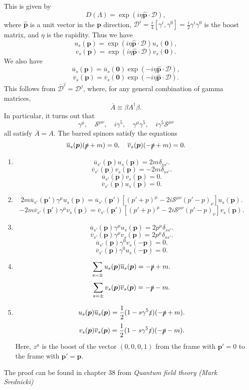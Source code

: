 This is given by
\[D(\Lambda) = \exp(i\eta \hat{\bm{p}} \cdot \bm{\mathcal{D}}),\]
where $\hat{\bm{p}}$ is a unit vector in the $\bm{p}$ direction, $\mathcal{D}^i = \frac{i}{4}[\gamma^i,\gamma^0] = \frac{i}{2} \gamma^i \gamma^0$ is the boost matrix, and $\eta$ is the rapidity. 
Thus we have
\[u_s(\bm{p}) = \exp(i\eta \hat{\bm{p}} \cdot \bm{\mathcal{D}}) u_s(\bm{0}),\]
\[v_s(\bm{p}) = \exp(i\eta \hat{\bm{p}} \cdot \bm{\mathcal{D}}) v_s(\bm{0}).\]
We also have
\[\overline{u}_s(\bm{p}) = \overline{u}_s(\bm{0}) \exp(-i\eta \hat{\bm{p}} \cdot \bm{\mathcal{D}}) ,\]
\[\overline{v}_s(\bm{p}) = \overline{v}_s(\bm{0}) \exp(-i\eta \hat{\bm{p}} \cdot \bm{\mathcal{D}}) .\]
This follows from $\overline{\mathcal{D}}^j = \mathcal{D}^j$, where, for any general combination of gamma matrices,
\[\overline{A} \equiv \beta A^{\dagger} \beta.\]
In particular, it turns out that
\[\gamma^{\mu} , \quad \mathcal{S}^{\mu \nu} , \quad i\gamma^5  , \quad \gamma^{\mu}\gamma^5 , \quad i\gamma^5 \mathcal{S}^{\mu \nu}\]
all satisfy $\overline{A} = A$.
The barred spinors satisfy the equations
\[\overline{u}_s(\bm{p})(\slashed{p}+m)=0 , \quad \overline{v}_s(\bm{p})(-\slashed{p}+m)=0.\]

\begin{newprop}
\begin{enumerate}
\item \[\overline{u}_{s'}(\bm{p}) u_s(\bm{p}) = 2m\delta_{ss'}.\]
\[\overline{v}_{s'}(\bm{p}) v_s(\bm{p}) = -2m\delta_{ss'}.\]
\[\overline{u}_{s'}(\bm{p}) v_s(\bm{p}) = 0.\]
\[\overline{v}_{s'}(\bm{p}) u_s(\bm{p}) = 0.\]
\item 
\[2m \overline{u}_{s'}(\bm{p}') \gamma^{\mu} u_s(\bm{p}) =  \overline{u}_{s'}(\bm{p}') [(p'+p)^{\mu} -2i \mathcal{S}^{\mu \nu}(p'-p)_{\nu}]u_s(\bm{p}).\]
\[-2m \overline{v}_{s'}(\bm{p}') \gamma^{\mu} v_s(\bm{p}) =  \overline{v}_{s'}(\bm{p}') [(p'+p)^{\mu} -2i \mathcal{S}^{\mu \nu}(p'-p)_{\nu}]v_s(\bm{p}).\]
\item   \[\overline{u}_{s'}(\bm{p}) \gamma^{\mu} u_s(\bm{p}) = 2p^{\mu} \delta_{ss'}.\]
\[\overline{v}_{s'}(\bm{p}) \gamma^{\mu} v_s(\bm{p}) = 2p^{\mu} \delta_{ss'}.\]
\[\overline{u}_{s'}(\bm{p}) \gamma^{0} v_s(-\bm{p}) = 0.\]
\[\overline{v}_{s'}(\bm{p}) \gamma^{0} u_s(-\bm{p}) = 0.\]
\item \[\sum_{s=\pm} u_s(\bm{p}) \overline{u}_s(\bm{p}) = - \slashed{p}+m .\]
\[\sum_{s=\pm} v_s(\bm{p}) \overline{v}_s(\bm{p}) = - \slashed{p}-m .\]
\item \[u_s(\bm{p}) \overline{u}_s(\bm{p}) =\frac{1}{2}(1-s\gamma^5\slashed{z})(-\slashed{p}+m).\]
 \[v_s(\bm{p}) \overline{v}_s(\bm{p}) =\frac{1}{2}(1-s\gamma^5\slashed{z})(-\slashed{p}-m).\]
Here, $z^{\mu}$ is the boost of the vector $(0,0,0,1)$ from the frame with $\bm{p}'=0$ to the frame with $\bm{p}'=\bm{p}$.  
\end{enumerate}
The proof can be found in chapter 38 from \emph{Quantum field theory (Mark Srednicki)}
\end{newprop}

